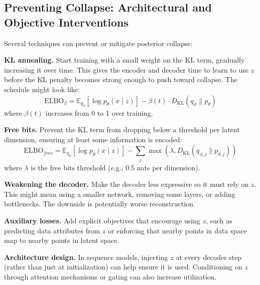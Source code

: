 \subsection{Preventing Collapse: Architectural and Objective Interventions}

Several techniques can prevent or mitigate posterior collapse:

\vspace{0.3cm}

\textbf{KL annealing.} Start training with a small weight on the KL term, gradually increasing it over time. This gives the encoder and decoder time to learn to use $z$ before the KL penalty becomes strong enough to push toward collapse. The schedule might look like:
%
\begin{equation}
\text{ELBO}_\beta = \mathbb{E}_{q_\phi}[\log p_\theta(x \mid z)] - \beta(t) \cdot D_{\text{KL}}(q_\phi \| p_\theta)
\end{equation}
%
where $\beta(t)$ increases from 0 to 1 over training.

\vspace{0.3cm}

\textbf{Free bits.} Prevent the KL term from dropping below a threshold per latent dimension, ensuring at least some information is encoded:
%
\begin{equation}
\text{ELBO}_{free} = \mathbb{E}_{q_\phi}[\log p_\theta(x \mid z)] - \sum_j \max(\lambda, D_{\text{KL}}(q_{\phi,j} \| p_{\theta,j}))
\end{equation}
%
where $\lambda$ is the free bits threshold (e.g., 0.5 nats per dimension).

\vspace{0.3cm}

\textbf{Weakening the decoder.} Make the decoder less expressive so it must rely on $z$. This might mean using a smaller network, removing some layers, or adding bottlenecks. The downside is potentially worse reconstruction.

\vspace{0.3cm}

\textbf{Auxiliary losses.} Add explicit objectives that encourage using $z$, such as predicting data attributes from $z$ or enforcing that nearby points in data space map to nearby points in latent space.

\vspace{0.3cm}

\textbf{Architecture design.} In sequence models, injecting $z$ at every decoder step (rather than just at initialization) can help ensure it is used. Conditioning on $z$ through attention mechanisms or gating can also increase utilization.

